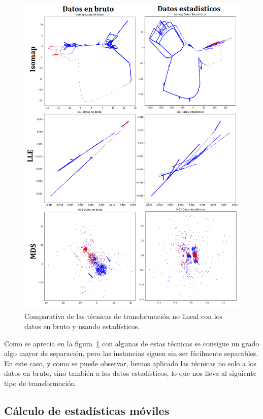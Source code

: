 \begin{figure}
	\centering
	\includegraphics[width=1\textwidth]{../img/manifolds.png}
	\caption{Comparativa de las técnicas de transformación no lineal con los datos en bruto y usando estadísticos.}
	\label{fig:manifolds}
\end{figure}

Como se aprecia en la figura~\ref{fig:manifolds} con algunas de estas técnicas se consigue un grado algo mayor de separación, pero las instancias siguen sin ser fácilmente separables. En este caso, y como se puede observar, hemos aplicado las técnicas no solo a los datos en bruto, sino también a los datos estadísticos, lo que nos lleva al siguiente tipo de transformación. 

\subsection{Cálculo de estadísticas móviles}

